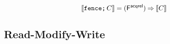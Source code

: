 \begin{align*}
  \sem{\FENCE\SEMI \aCmd} & =
  (\DF{}) \prefix \sem{\aCmd}
\end{align*}

\subsection{Read-Modify-Write}




